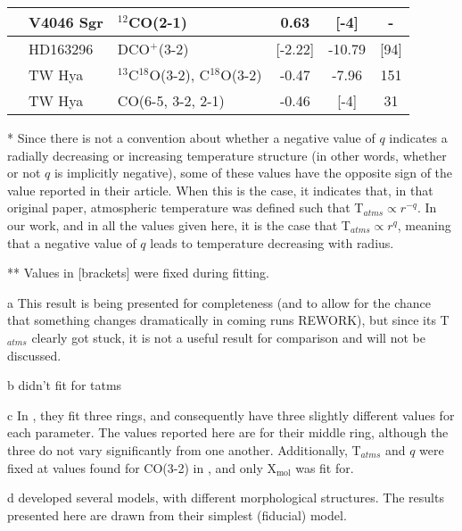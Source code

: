 \begin{table}[h!]
\begin{threeparttable}
\begin{tabular}{l l l c c c }
      \hline
      \citet{Rosenfeld2012}\tnote{b}        & V4046 Sgr  & $^{12}$CO(2-1) & 0.63 & [-4]           & -  \\
      \hline
      \citet{Flaherty2017}\tnote{c}         & HD163296   & DCO$^+$(3-2)   & [-2.22] & -10.79        & [94]  \\
      \hline
      \citet{Zhang2017}                     & TW Hya     & $^{13}$C$^{18}$O(3-2), C$^{18}$O(3-2)  & -0.47 & -7.96 & 151  \\
      \hline
      \citet{Flaherty2018}\tnote{d}         & TW Hya     & CO(6-5, 3-2, 2-1) & -0.46 & [-4]       & 31  \\
      \bottomrule
    \end{tabular}
    \begin{tablenotes}\footnotesize
      \item[*] Since there is not a convention about whether a negative value of $q$ indicates a radially decreasing or increasing temperature structure (in other words, whether or not $q$ is implicitly negative), some of these values have the opposite sign of the value reported in their article. When this is the case, it indicates that, in that original paper, atmospheric temperature was defined such that T$_{atms} \propto r^{-q}$. In our work, and in all the values given here, it is the case that T$_{atms} \propto r^{q}$, meaning that a negative value of $q$ leads to temperature decreasing with radius.
      \item[**] Values in [brackets] were fixed during fitting.
      \item[a] This result is being presented for completeness (and to allow for the chance that something changes dramatically in coming runs REWORK), but since its T$_{atms}$ clearly got stuck, it is not a useful result for comparison and will not be discussed.
      \item[b] \cite{Rosenfeld2012} didn't fit for tatms
      \item[c] In \citet{Flaherty2017}, they fit three rings, and consequently have three slightly different values for each parameter. The values reported here are for their middle ring, although the three do not vary significantly from one another. Additionally, T$_{atms}$ and $q$ were fixed at values found for CO(3-2) in \citet{Flaherty2015}, and only X$_\text{mol}$ was fit for.
      \item[d] \citet{Flaherty2018} developed several models, with different morphological structures. The results presented here are drawn from their simplest (fiducial) model.
    \end{tablenotes}
  \end{threeparttable}
\end{table}


